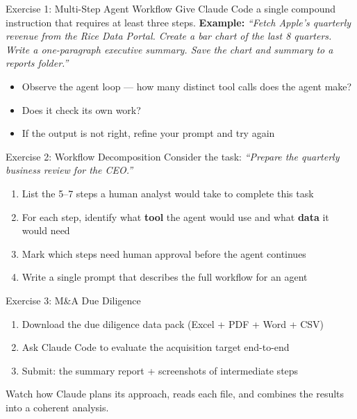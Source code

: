 \documentclass[aspectratio=169]{beamer}
\begin{document}
\begin{frame}{Exercise 1: Multi-Step Agent Workflow}
Give Claude Code a single compound instruction that requires at least three steps.
\vspace{0.3cm}
\textbf{Example:} \textit{``Fetch Apple's quarterly revenue from the Rice Data Portal.  Create a bar chart of the last 8 quarters.  Write a one-paragraph executive summary.  Save the chart and summary to a reports folder.''}
\vspace{0.3cm}
\begin{itemize}
  \item Observe the agent loop --- how many distinct tool calls does the agent make?
  \item Does it check its own work?
  \item If the output is not right, refine your prompt and try again
\end{itemize}
\end{frame}

\begin{frame}{Exercise 2: Workflow Decomposition}
Consider the task: \textit{``Prepare the quarterly business review for the CEO.''}
\vspace{0.3cm}
\begin{enumerate}
  \item List the 5--7 steps a human analyst would take to complete this task
  \item For each step, identify what \textbf{tool} the agent would use and what \textbf{data} it would need
  \item Mark which steps need \alert{human approval} before the agent continues
  \item Write a single prompt that describes the full workflow for an agent
\end{enumerate}
\end{frame}

\begin{frame}{Exercise 3: M\&A Due Diligence}
\begin{enumerate}
  \item Download the due diligence data pack (Excel + PDF + Word + CSV)
  \item Ask Claude Code to evaluate the acquisition target end-to-end
  \item Submit: the summary report + screenshots of intermediate steps
\end{enumerate}
\vspace{0.3cm}
Watch how Claude plans its approach, reads each file, and combines the results into a coherent analysis.
\end{frame}
\end{document}
